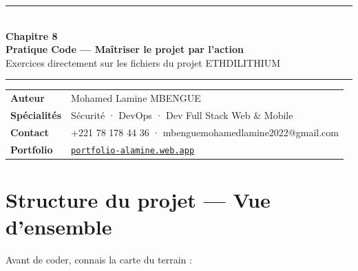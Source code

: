 \documentclass[12pt, a4paper]{article}
\begin{document}
\begin{center}
  {\color{suva_blue}\rule{\linewidth}{2pt}}\\[0.5cm]
  {\Huge\bfseries\color{suva_blue} Chapitre 8}\\[0.3cm]
  {\large\bfseries Pratique Code --- Maîtriser le projet par l'action}\\[0.2cm]
  {\small\color{gray} Exercices directement sur les fichiers du projet ETHDILITHIUM}\\[0.3cm]
  {\color{suva_blue}\rule{\linewidth}{2pt}}
\end{center}

\vspace{0.3cm}
\begin{tcolorbox}[colback=suva_blue!5, colframe=suva_blue!40,
  left=6pt, right=6pt, top=4pt, bottom=4pt]
\small
\begin{tabular}{ll}
  \textbf{Auteur}      & Mohamed Lamine MBENGUE \\
  \textbf{Spécialités} & Sécurité · DevOps · Dev Full Stack Web \& Mobile \\
  \textbf{Contact}     & +221 78 178 44 36 · mbenguemohamedlamine2022@gmail.com \\
  \textbf{Portfolio}   & \href{https://portfolio-alamine.web.app}{\texttt{portfolio-alamine.web.app}} \\
\end{tabular}
\end{tcolorbox}
\vspace{0.3cm}

\tableofcontents
\newpage

\section{Structure du projet --- Vue d'ensemble}

Avant de coder, connais la carte du terrain :
\end{document}
